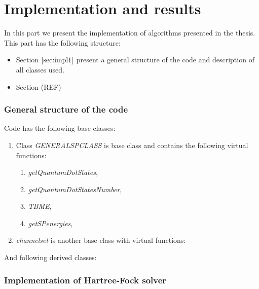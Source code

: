 \documentclass[twoside,english]{uiofysmaster}
\theoremstyle{definition}
\begin{document}
\part{Implementation and results}
In this part we present the implementation of algorithms presented in the thesis. This part has the following structure:\\
\begin{itemize}
\item Section $\ref{sec:impl1}$ present a general structure of the code and description of all classes used.
\item Section (REF) 
\end{itemize}

\section{General structure of the code}\label{sec:impl1}
Code has the following base classes:
\begin{enumerate}
\item Class \textit{GENERALSPCLASS} is base class and contains the following virtual functions:
	\begin{enumerate}
	\item \textit{getQuantumDotStates},
	\item \textit{getQuantumDotStatesNumber},
	\item \textit{TBME},
	\item \textit{getSPenergies},
	\end{enumerate}
\item \textit{channelset} is another base class with virtual functions:
\end{enumerate}
And following derived classes:

\section{Implementation of Hartree-Fock solver}
\end{document}
